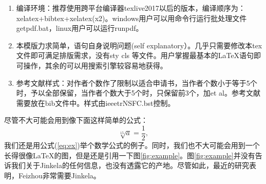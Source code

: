 \documentclass[12pt,UTF8,AutoFakeBold=2,a4paper]{ctexart} %
\begin{document}
\iffalse

\vskip 2mm



\begin{enumerate}
\item 编译环境：推荐使用跨平台编译器texlive2017以后的版本，编译顺序为：xelatex+bibtex+xelatex(x2)。windows用户可以用命令行运行批处理文件getpdf.bat，linux用户可以运行runpdf。
\item 本模版力求简单，语句自身说明问题(self explanatory）。几乎只需要修改本tex文件即可满足排版需求，没有sty cls 等文件。用户掌握最基本的\LaTeX 语句即可操作，其余的可以用搜索引擎较容易地获得。
\item 参考文献样式：对作者个数作了限制以适合申请书，当作者个数小于等于5个时，予以全部保留，当作者个数大于5个时，只保留前3个，加et al。参考文献需要放在bib文件中。样式由ieeetrNSFC.bst控制。
\end{enumerate}

尽管不大可能会用到像下面这样简单的公式：
\begin{equation}
\label{eq:ex}
\sqrt[15]{a}=\frac{1}{2},
\end{equation}
我们还是用公式(\ref{eq:ex})举个数学公式的例子。同时，我们也不大可能会用到一个长得很像\LaTeX 的图，但是还是引用一下图\ref{fig:example}。图\ref{fig:example}并没有告诉我们关于Jinkela\cite{John1997,Smith1900}的任何信息，也没有透露它的产地\cite{Piter1992}。尽管如此，最近的研究表明，Feizhou非常需要Jinkela\cite{John1997}。
\end{document}

